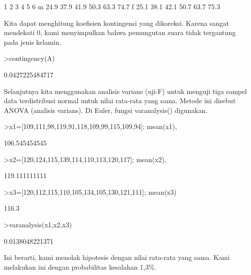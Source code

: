 \documentclass[a4paper,10pt]{article}
\begin{document}
\begin{eulernotebook}
\begin{eulerprompt}
\end{eulerprompt}
\begin{euleroutput}
             1     2     3     4     5     6
       m  24.9  37.9  41.9  50.3  63.3  74.7
       f  25.1  38.1  42.1  50.7  63.7  75.3
\end{euleroutput}
\begin{eulercomment}
Kita dapat menghitung koefisien kontingensi yang dikoreksi. Karena
sangat mendekati 0, kami menyimpulkan bahwa pemungutan suara tidak
tergantung pada jenis kelamin.
\end{eulercomment}
\begin{eulerprompt}
>contingency(A)
\end{eulerprompt}
\begin{euleroutput}
  0.0427225484717
\end{euleroutput}
\begin{eulercomment}
\begin{eulercomment}
\begin{eulercomment}
Selanjutnya kita menggunakan analisis varians (uji-F) untuk menguji
tiga sampel data terdistribusi normal untuk nilai rata-rata yang sama.
Metode ini disebut ANOVA (analisis varians). Di Euler, fungsi
varanalysis() digunakan.
\end{eulercomment}
\begin{eulerprompt}
>x1=[109,111,98,119,91,118,109,99,115,109,94]; mean(x1),
\end{eulerprompt}
\begin{euleroutput}
  106.545454545
\end{euleroutput}
\begin{eulerprompt}
>x2=[120,124,115,139,114,110,113,120,117]; mean(x2),
\end{eulerprompt}
\begin{euleroutput}
  119.111111111
\end{euleroutput}
\begin{eulerprompt}
>x3=[120,112,115,110,105,134,105,130,121,111]; mean(x3)
\end{eulerprompt}
\begin{euleroutput}
  116.3
\end{euleroutput}
\begin{eulerprompt}
>varanalysis(x1,x2,x3)
\end{eulerprompt}
\begin{euleroutput}
  0.0138048221371
\end{euleroutput}
\begin{eulercomment}
Ini berarti, kami menolak hipotesis dengan nilai rata-rata yang sama.
Kami melakukan ini dengan probabilitas kesalahan 1,3\%.


\end{eulercomment}
\end{eulercomment}
\end{eulercomment}
\end{eulernotebook}
\end{document}

